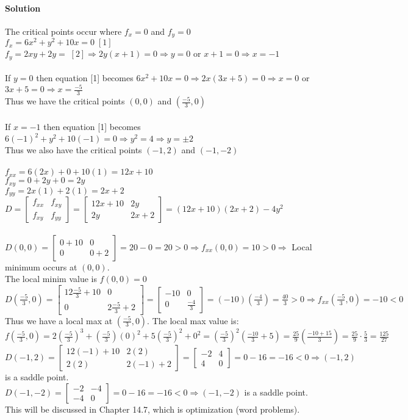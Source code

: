 \documentclass{article}
\newcommand{\mat}[4]{\begin{bmatrix} #1 & #2 \\ #3 & #4 \end{bmatrix}}
\begin{document}
\paragraph{Solution} The critical points occur where $f_x=0$ and $f_y=0$
\\$f_x=6x^2+y^2+10x=0\;[1]$
\\$f_y=2xy+2y=\;[2]\Rightarrow 2y(x+1)=0\Rightarrow y=0$ or $x+1=0\Rightarrow x=-1$
\\\\If $y=0$ then equation [1] becomes $6x^2+10x=0\Rightarrow2x(3x+5)=0\Rightarrow x=0$ or $3x+5=0\Rightarrow x=\frac{-5}{3}$
\\Thus we have the critical points $(0,0)$ and $(\frac{-5}{3},0)$
\\\\If $x=-1$ then equation [1] becomes $6(-1)^2+y^2+10(-1)=0\Rightarrow y^2=4\Rightarrow y=\pm2$
\\Thus we also have the critical points $(-1,2)$ and $(-1,-2)$
\\\\$f_{xx}=6(2x)+0+10(1)=12x+10$
\\$f_{xy}=0+2y+0=2y$
\\$f_{yy}=2x(1)+2(1)=2x+2$
\\$D=\mat{f_{xx}}{f_{xy}}{f_{xy}}{f_{yy}}=\mat{12x+10}{2y}{2y}{2x+2}=(12x+10)(2x+2)-4y^2$
\\\\$D(0,0)=\mat{0+10}{0}{0}{0+2}=20-0=20>0\Rightarrow f_{xx}(0,0)=10>0\Rightarrow$ Local minimum occurs at $(0,0)$.
\\The local minim value is $f(0,0)=0$
\\$D(\frac{-5}{3},0)=\mat{12\frac{-5}{3}+10}{0}{0}{2\frac{-5}{3}+2}=\mat{-10}{0}{0}{\frac{-4}{3}}=(-10)(\frac{-4}{3})=\frac{40}{3}>0\Rightarrow f_{xx}(\frac{-5}{3},0)=-10<0$
\\Thus we have a local max at $(\frac{-5}{3},0)$. The local max value is:
\\$f(\frac{-5}{3},0)=2(\frac{-5}{3})^3+(\frac{-5}{3})(0)^2+5(\frac{-5}{3})^2+0^2=(\frac{-5}{3})^2(\frac{-10}{3}+5)=\frac{25}{9}(\frac{-10+15}{3})=\frac{25}{9}\cdot\frac{5}{3}=\frac{125}{27}$
\newpage$D(-1,2)=\mat{12(-1)+10}{2(2)}{2(2)}{2(-1)+2}=\mat{-2}{4}{4}{0}=0-16=-16<0\Rightarrow(-1,2)$ is a saddle point.
\\$D(-1,-2)=\mat{-2}{-4}{-4}{0}=0-16=-16<0\Rightarrow(-1,-2)$ is a saddle point.
\\This will be discussed in Chapter 14.7, which is optimization (word problems).
\end{document}
